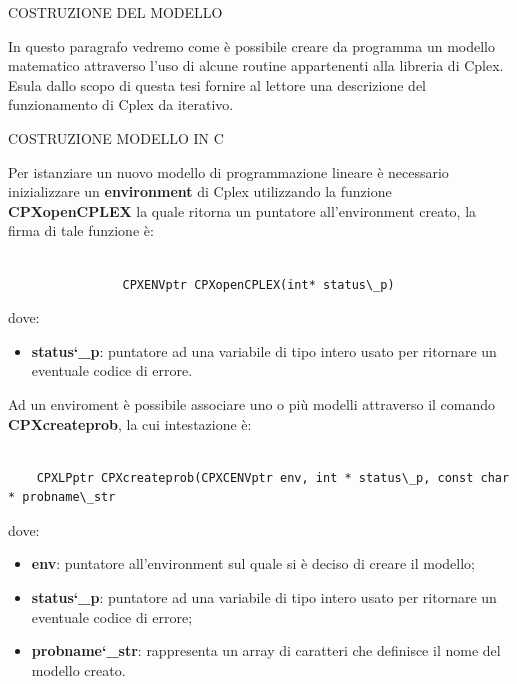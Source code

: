 \documentclass[11pt]{article}
\begin{document}
\vspace{2\baselineskip}
COSTRUZIONE DEL MODELLO
\vspace{2\baselineskip}

In questo paragrafo vedremo come \`e possibile creare da programma un modello matematico attraverso l'uso di alcune routine appartenenti alla libreria di Cplex. Esula dallo scopo di questa tesi fornire al lettore una descrizione del funzionamento di Cplex da iterativo.


\vspace{2\baselineskip}
COSTRUZIONE MODELLO IN C
\vspace{2\baselineskip}

Per istanziare un nuovo modello di programmazione lineare \`e necessario inizializzare un \textbf{environment} di Cplex utilizzando la funzione \textbf{CPXopenCPLEX} la quale ritorna un puntatore all'environment creato, la firma di tale funzione \`e:


\begin{lstlisting}

                CPXENVptr CPXopenCPLEX(int* status\_p)

\end{lstlisting}

dove:

\begin{itemize}
\item \textbf{status\char`\_p}: puntatore ad una variabile di tipo intero usato per ritornare un eventuale codice di errore.
\end{itemize}


Ad un enviroment è possibile associare uno o pi\`u modelli attraverso il comando \textbf{CPXcreateprob}, la cui intestazione \`e:

\begin{lstlisting}

    CPXLPptr CPXcreateprob(CPXCENVptr env, int * status\_p, const char * probname\_str

\end{lstlisting}


dove:

\begin{itemize}
	\item \textbf{env}: puntatore all'environment sul quale si \`e deciso di creare il modello;
	\item \textbf{status\char`\_p}: puntatore ad una variabile di tipo intero usato per ritornare un eventuale codice di errore;
	\item \textbf{probname\char`\_str}: rappresenta un array di caratteri che definisce il nome del modello creato.
\end{itemize}
\end{document}
